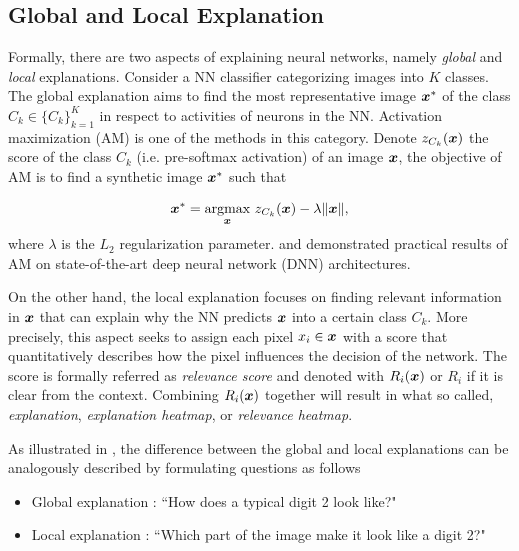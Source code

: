 \subsection{Global and Local Explanation}\label{sec:global_local_explanation}

Formally, there are two aspects of explaining neural networks, namely \textit{global} and \textit{local} explanations. Consider a NN  classifier categorizing images into $K$ classes.  The global explanation aims to find the most representative image $\patvector{x}^*$ of the class $C_k \in \{C_k\}_{k=1}^K$ in respect to activities of neurons in the NN. Activation maximization (AM) \citep{ ErhanUnderstandingRepresentationsLearned2010,SimonyanDeepConvolutionalNetworks2013} is one of the methods in this category. Denote $z_{C_k}(\boldsymbol{x})$  the score of the class $C_k$ (i.e. pre-softmax activation) of an image $\boldsymbol{x}$, the objective of AM is to find a synthetic image $\boldsymbol{x}^*$ such that  

\begin{align*}
\patvector{x}^*  = \patarg{max}{\patvector{x}} z_{C_k}(\x) - \lambda \|\x\|,
\end{align*}
where $\lambda$ is the $L_2$ regularization parameter. \citet{SimonyanDeepConvolutionalNetworks2013} and \citet{NguyenSynthesizingpreferredinputs2016a} demonstrated practical results of AM on state-of-the-art deep neural network (DNN) architectures.

On the other hand, the local explanation focuses on finding relevant information in $\patvector{x}$ that can explain why the NN predicts $\boldsymbol{x}$ into a certain class $C_k$.  More precisely, this aspect seeks to assign each pixel $x_i \in \patvector{x}$ with a score that quantitatively describes how the pixel influences the decision of the network. The score is formally referred as \textit{relevance score} and denoted with $R_i(\boldsymbol{x})$ or $R_i$ if it is clear from the context. Combining $R_i(\boldsymbol{x})$ together will result in what so called, \textit{explanation}, \textit{explanation heatmap}, or \textit{relevance heatmap}.

As illustrated in \addfigure{\ref{fig:comparision_between_global_and_local_analysis}}, the difference between the global and local explanations can be analogously described by formulating questions as follows
\begin{itemize}
	\item Global explanation : ``How does a typical digit 2 look like?"
    \item Local explanation : ``Which part of the image make it look like a digit 2?" 
\end{itemize}

